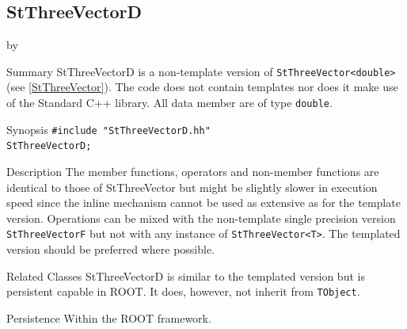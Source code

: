 \documentclass[twoside]{article}
\newcommand{\entrylabel}[1]{\mbox{\textbf{{#1}}}\hfil}%
\newenvironment{entry}
{\begin{list}{}%
    {\renewcommand{\makelabel}{\entrylabel}%
     \setlength{\labelwidth}{90pt}%
     \setlength{\leftmargin}{\labelwidth}
     \advance\leftmargin by \labelsep%
      }%
    }%
  {\end{list}}
\newcommand{\Entrylabel}[1]%
{\raisebox{0pt}[1ex][0pt]{\makebox[\labelwidth][l]%
    {\parbox[t]{\labelwidth}{\hspace{0pt}\textbf{{#1}}}}}}
\newenvironment{Entry}%
{\renewcommand{\entrylabel}{\Entrylabel}\begin{entry}}%
  {\end{entry}}
\begin{document}
\subsection{StThreeVectorD }
\begin{Entry}
\item[Summary]
    StThreeVectorD is a non-template version of \verb+StThreeVector<double>+
    (see \ref{StThreeVector}). The code does not contain templates nor
    does it make use of the Standard C++ library. All data member are of
    type \texttt{double}.
    
\item[Synopsis]
    \verb+#include "StThreeVectorD.hh"+ \\
    \verb+StThreeVectorD;+
    
    
\item[Description]       
    The member functions, operators and non-member functions are identical
    to those of StThreeVector but might be slightly slower in execution speed
    since the inline mechanism cannot be used as extensive as for the template
    version. Operations can be mixed with the non-template single precision version
    \texttt{StThreeVectorF} but not with any instance of \verb+StThreeVector<T>+.
    The templated version should be preferred where possible.
    
\item[Related Classes]
    StThreeVectorD is similar to the templated version but
    is persistent capable in ROOT. It does, however, not inherit
    from \texttt{TObject}.

\item[Persistence]
    Within the ROOT framework.

\end{Entry}

%
%
\end{document}
